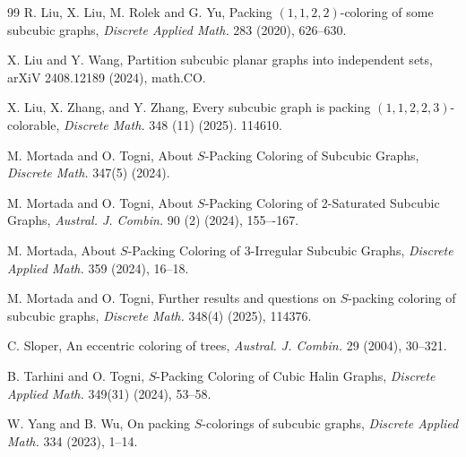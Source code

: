 \documentclass[12pt, oneside]{scrartcl}
\begin{document}
\begin{thebibliography}{99}
 R. Liu, X. Liu, M. Rolek and G. Yu, Packing $(1,1,2,2)$-coloring of some subcubic graphs, \textit{Discrete Applied Math.} 283 (2020), 626--630.

  X. Liu and Y. Wang, Partition subcubic planar graphs into independent sets, arXiV 2408.12189 (2024), math.CO.

 X. Liu, X. Zhang, and Y. Zhang, Every subcubic graph is packing $(1,1,2,2,3)$-colorable, \textit{Discrete Math.} 348 (11) (2025). 114610. 

 M. Mortada and O. Togni, About $S$-Packing Coloring of Subcubic Graphs, \textit{Discrete Math.} 347(5) (2024).

 M. Mortada and O. Togni, About $S$-Packing Coloring of 2-Saturated Subcubic Graphs, \textit{Austral. J. Combin.} 90 (2) (2024), 155–-167.

 M. Mortada, About $S$-Packing Coloring of 3-Irregular Subcubic Graphs, \textit{Discrete Applied Math.} 359 (2024), 16--18.

 M. Mortada and O. Togni, Further results and questions on $S$-packing coloring of subcubic graphs, \textit{Discrete Math.} 348(4) (2025), 114376.

 C. Sloper, An eccentric coloring of trees, \textit{Austral. J. Combin.} 29 (2004), 30--321.

 B. Tarhini and O. Togni, $S$-Packing Coloring of Cubic Halin Graphs, \textit{Discrete Applied Math.} 349(31) (2024), 53--58.

  W. Yang and B. Wu, On packing $S$-colorings of subcubic graphs, \textit{Discrete Applied Math.} 334 (2023), 1--14.

\end{thebibliography}
\end{document}
